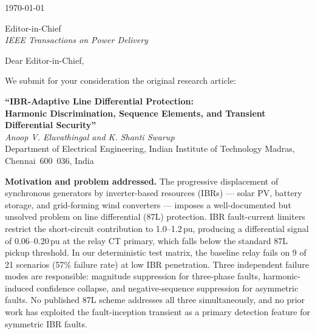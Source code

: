 \documentclass[11pt,a4paper]{article}
\begin{document}
\noindent
\today

\bigskip

\noindent
Editor-in-Chief\\
\textit{IEEE Transactions on Power Delivery}

\bigskip

\noindent
Dear Editor-in-Chief,

\medskip

We submit for your consideration the original research article:

\begin{center}
\textbf{``IBR-Adaptive Line Differential Protection:\\
Harmonic Discrimination, Sequence Elements, and Transient Differential
Security''}\\[4pt]
\textit{Anoop V. Eluvathingal and K. Shanti Swarup}\\
Department of Electrical Engineering, Indian Institute of Technology Madras,
Chennai~600~036, India
\end{center}

\medskip\noindent\textbf{Motivation and problem addressed.}
The progressive displacement of synchronous generators by inverter-based
resources (IBRs) --- solar PV, battery storage, and grid-forming wind
converters --- imposes a well-documented but unsolved problem on line
differential (87L) protection.
IBR fault-current limiters restrict the short-circuit contribution to
1.0--1.2\,pu, producing a differential signal of 0.06--0.20\,pu at the
relay CT primary, which falls below the standard 87L pickup threshold.
In our deterministic test matrix, the baseline relay fails on 9 of 21
scenarios (57\% failure rate) at low IBR penetration.
Three independent failure modes are responsible: magnitude suppression for
three-phase faults, harmonic-induced confidence collapse, and
negative-sequence suppression for asymmetric faults.
No published 87L scheme addresses all three simultaneously, and no prior
work has exploited the fault-inception transient as a primary detection
feature for symmetric IBR faults.
\end{document}
